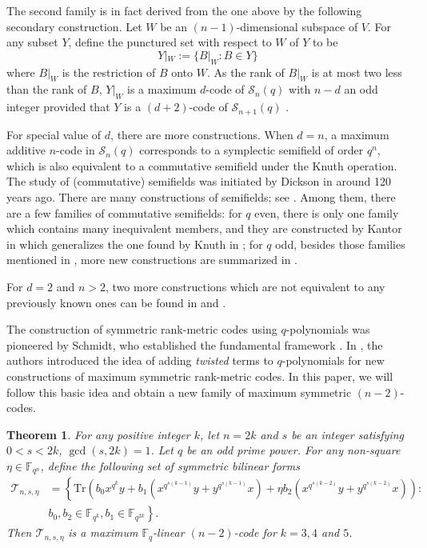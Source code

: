 \documentclass{amsart}
\theoremstyle{plain}
\newtheorem{theorem}{Theorem}[section]
\theoremstyle{definition}
\newcommand{\F}{\mathbb F}
\newcommand{\fqn}{\mathbb{F}_{q^n}}
\newcommand{\fq}{\mathbb{F}_{q}}
\newcommand{\sS}{\mathscr S}
\newcommand{\Tr}{ \ensuremath{ \mathrm{Tr}}}
\newcommand{\cT}{\mathcal{T}}
\begin{document}
	The second family is in fact derived from the one above by the following secondary construction. Let $W$ be an $(n-1)$-dimensional subspace of $V$. For any subset $Y$,  define the punctured set with respect to $W$ of $Y$ to be
	$$Y|_W := \{B|_W : B\in Y\}$$
	where $B|_W$ is the restriction of $B$ onto $W$. As the rank of $B|_W$ is at most two less than the rank of $B$, $Y|_W$ is a maximum $d$-code of $\sS_n(q)$ with $n-d$ an odd integer provided that $Y$ is a $(d+2)$-code of $\sS_{n+1}(q)$ \cite[Theorem 4.1]{Schmidt_2015}.
	
	For special value of $d$, there are more constructions. When $d=n$, a maximum additive $n$-code in $\sS_n(q)$ corresponds to a symplectic semifield of order $q^n$, which is also equivalent to a commutative semifield under the Knuth operation. The study of (commutative) semifields was initiated by Dickson in \cite{dickson_commutative_1906} around 120 years ago. There are many constructions of semifields; see \cite{lavrauw_semifields_2011}. Among them, there are a few families of commutative semifields: for $q$ even, there is only one family which contains many inequivalent members, and they are constructed by Kantor in \cite{kantor_commutative_2003} which generalizes the one found by Knuth in \cite{knuth_class_1965}; for $q$ odd, besides those families mentioned in \cite{lavrauw_semifields_2011}, more new constructions are summarized in \cite{gologlu_exponential_2023}.
	
	For $d=2$ and $n>2$, two more constructions which are not equivalent to any previously known ones can be found in \cite{LLTZ} and \cite{zhou}.
	
	The construction of symmetric rank-metric codes using $q$-polynomials was pioneered by Schmidt, who established the fundamental framework \cite{Schmidt_2010}. In \cite{LLTZ}, the authors introduced the idea of adding \emph{twisted} terms to $q$-polynomials for new constructions of maximum symmetric rank-metric codes. 
		In this paper, we will follow this basic idea and obtain a new family of maximum symmetric $(n-2)$-codes.
	\begin{theorem}\label{th:main}
		For any positive integer $k$, let $n=2k$ and $s$ be an integer satisfying $0<s<2k$, $\gcd(s,2k)=1$. Let $q$ be an odd prime power. For any non-square $\eta\in \fqn$, define the following set of symmetric bilinear forms
		\begin{align*}
			\cT_{n,s,\eta}&=\left\{\Tr\left(b_0x^{q^{k}}y+b_1\left(x^{q^{s(k-1)}}y+y^{q^{s(k-1)}}x\right)+\eta b_2\left(x^{q^{ s(k-2)}}y+y^{q^{s(k-2)}}x\right)\right) \right.:\\ 
			&\left.		b_0, b_2\in\F_{q^k},b_1\in\F_{q^{2k}}\right\}.
		\end{align*}
		Then $\cT_{n,s,\eta}$ is a maximum $\fq$-linear $(n-2)$-code for $k=3,4$ and $5$.
	\end{theorem}
	
\end{document}
